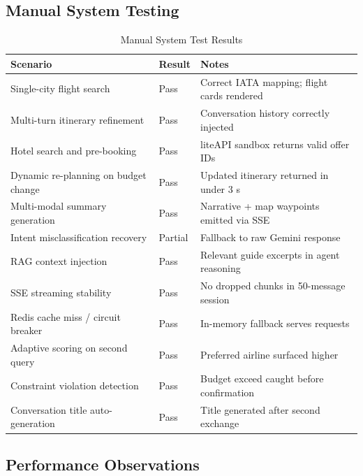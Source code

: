 \documentclass[12pt, a4paper]{article}
\begin{document}
\subsection{Manual System Testing}

\begin{table}[H]
\centering
\renewcommand{\arraystretch}{1.3}
\begin{tabularx}{\textwidth}{|X|l|p{4.5cm}|}
  \hline
  \textbf{Scenario} & \textbf{Result} & \textbf{Notes} \\
  \hline
  Single-city flight search              & Pass    & Correct IATA mapping; flight cards rendered \\
  \hline
  Multi-turn itinerary refinement        & Pass    & Conversation history correctly injected \\
  \hline
  Hotel search and pre-booking           & Pass    & liteAPI sandbox returns valid offer IDs \\
  \hline
  Dynamic re-planning on budget change   & Pass    & Updated itinerary returned in under 3 s \\
  \hline
  Multi-modal summary generation         & Pass    & Narrative + map waypoints emitted via SSE \\
  \hline
  Intent misclassification recovery      & Partial & Fallback to raw Gemini response \\
  \hline
  RAG context injection                  & Pass    & Relevant guide excerpts in agent reasoning \\
  \hline
  SSE streaming stability                & Pass    & No dropped chunks in 50-message session \\
  \hline
  Redis cache miss / circuit breaker     & Pass    & In-memory fallback serves requests \\
  \hline
  Adaptive scoring on second query       & Pass    & Preferred airline surfaced higher \\
  \hline
  Constraint violation detection         & Pass    & Budget exceed caught before confirmation \\
  \hline
  Conversation title auto-generation     & Pass    & Title generated after second exchange \\
  \hline
\end{tabularx}
\caption{Manual System Test Results}
\end{table}

\subsection{Performance Observations}
\end{document}
